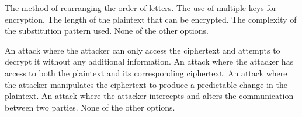 \begin{checkboxes}
    \choice The method of rearranging the order of letters.
    \choice The use of multiple keys for encryption.
    \choice The length of the plaintext that can be encrypted.
    \CorrectChoice The complexity of the substitution pattern used.
    \choice None of the other options.
\end{checkboxes}

\begin{checkboxes}
    \CorrectChoice An attack where the attacker can only access the ciphertext and attempts to decrypt it without any additional information.
    \choice An attack where the attacker has access to both the plaintext and its corresponding ciphertext.
    \choice An attack where the attacker manipulates the ciphertext to produce a predictable change in the plaintext.
    \choice An attack where the attacker intercepts and alters the communication between two parties.
    \choice None of the other options.
\end{checkboxes}

